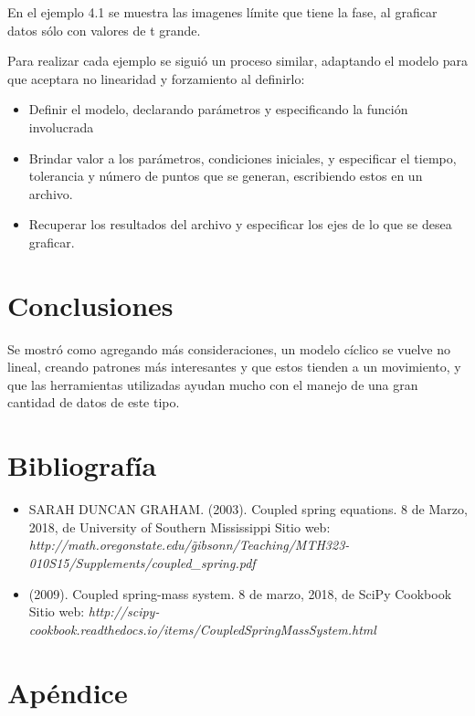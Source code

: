 \documentclass[a4paper]{article}
\begin{document}
En el ejemplo 4.1 se muestra las imagenes límite que tiene la fase, al graficar datos sólo con valores de t grande.

Para realizar cada ejemplo se siguió un proceso similar, adaptando el modelo para que aceptara no linearidad y forzamiento al definirlo:

\begin{itemize}
\item Definir el modelo, declarando parámetros y especificando la función involucrada
\item Brindar valor a los parámetros, condiciones iniciales, y especificar el tiempo, tolerancia y número de puntos que se generan, escribiendo estos en un archivo.
\item Recuperar los resultados del archivo y especificar los ejes de lo que se desea graficar.
\end{itemize}

\section{Conclusiones}

Se mostró como agregando más consideraciones, un modelo cíclico se vuelve no lineal, creando patrones más interesantes y que estos tienden a un movimiento, y que las herramientas utilizadas ayudan mucho con el manejo de una gran cantidad de datos de este tipo.


\section{Bibliografía}

\begin{itemize}
\item 	SARAH DUNCAN GRAHAM. (2003). Coupled spring equations. 8 de Marzo, 2018, de University of Southern Mississippi Sitio web: 
\textit{http://math.oregonstate.edu/\~gibsonn/Teaching/MTH323-010S15/Supplements/coupled\_spring.pdf}

\item (2009). Coupled spring-mass system. 8 de marzo, 2018, de SciPy Cookbook Sitio web: 
\textit{http://scipy-cookbook.readthedocs.io/items/CoupledSpringMassSystem.html}
\end{itemize}


\section{Apéndice}
\end{document}
